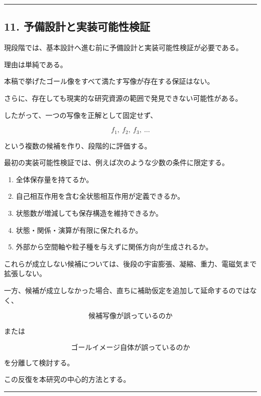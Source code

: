 \documentclass[
  a4paper,
]{ltjsarticle}
\providecommand{\tightlist}{%
  \setlength{\itemsep}{0pt}\setlength{\parskip}{0pt}}
\begin{document}
\begin{center}\rule{0.5\linewidth}{0.5pt}\end{center}

\subsection{11.
予備設計と実装可能性検証}\label{ux4e88ux5099ux8a2dux8a08ux3068ux5b9fux88c5ux53efux80fdux6027ux691cux8a3c}

現段階では、基本設計へ進む前に予備設計と実装可能性検証が必要である。

理由は単純である。

本稿で挙げたゴール像をすべて満たす写像が存在する保証はない。

さらに、存在しても現実的な研究資源の範囲で発見できない可能性がある。

したがって、一つの写像を正解として固定せず、

\[
f_1,
\ f_2,
\ f_3,
\ \ldots
\]

という複数の候補を作り、段階的に評価する。

最初の実装可能性検証では、例えば次のような少数の条件に限定する。

\begin{enumerate}
\def\labelenumi{\arabic{enumi}.}
\tightlist
\item
  全体保存量を持てるか。
\item
  自己相互作用を含む全状態相互作用が定義できるか。
\item
  状態数が増減しても保存構造を維持できるか。
\item
  状態・関係・演算が有限に保たれるか。
\item
  外部から空間軸や粒子種を与えずに関係方向が生成されるか。
\end{enumerate}

これらが成立しない候補については、後段の宇宙膨張、凝縮、重力、電磁気まで拡張しない。

一方、候補が成立しなかった場合、直ちに補助仮定を追加して延命するのではなく、

\[
\boxed{
\text{候補写像が誤っているのか}
}
\]

または

\[
\boxed{
\text{ゴールイメージ自体が誤っているのか}
}
\]

を分離して検討する。

この反復を本研究の中心的方法とする。

\begin{center}\rule{0.5\linewidth}{0.5pt}\end{center}
\end{document}
